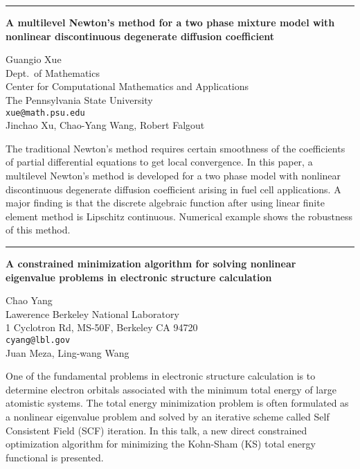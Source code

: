 \documentclass[twosided]{report}
\begin{document}
	\begin{center} \rule{6in}{1pt} \end{center}

\begin{center}
{\large			%
{\bf A multilevel Newton's method for a two phase mixture model with \\
	nonlinear discontinuous degenerate diffusion coefficient}}

	Guangio Xue \\
	Dept.~of Mathematics \\
	Center for Computational Mathematics and Applications \\
	The Pennsylvania State University \\
	{\tt xue@math.psu.edu} \\
	Jinchao Xu, Chao-Yang Wang, Robert Falgout
\end{center}
The traditional Newton's method requires certain smoothness of
the coefficients of partial differential equations to get local
convergence. In this paper, a multilevel Newton's method is
developed for a two phase model with nonlinear discontinuous
degenerate diffusion coefficient arising in fuel cell
applications. A major finding is that the discrete algebraic
function after using linear finite element method is
Lipschitz continuous.
Numerical example shows the robustness of this method.


	\begin{center} \rule{6in}{1pt} \end{center}

\begin{center}
{\large			%
{\bf A constrained minimization algorithm for solving nonlinear \\
	eigenvalue problems in electronic structure calculation}}

	Chao Yang \\
	Lawerence Berkeley National Laboratory \\
	1 Cyclotron Rd, MS-50F, Berkeley CA 94720 \\
	{\tt cyang@lbl.gov} \\
	Juan Meza, Ling-wang Wang
\end{center}
One of the fundamental problems in electronic structure
calculation is to determine electron orbitals associated
with the minimum total energy of large atomistic systems.
The total energy minimization problem is often formulated as
a nonlinear eigenvalue problem and solved by an iterative
scheme called Self Consistent Field (SCF) iteration. In this
talk, a new direct constrained optimization algorithm for
minimizing the Kohn-Sham (KS) total energy functional is
presented.
\end{document}
